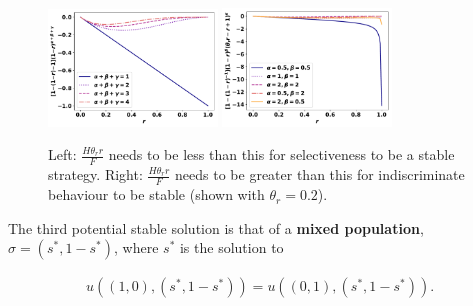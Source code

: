 \documentclass[10pt]{article}
\begin{document}
\begin{figure}[h]
\centering
\includegraphics[width = 0.4\textwidth]{images/SelectiveInequality}
\includegraphics[width = 0.4\textwidth, height=.275\textwidth]{images/IndiscriminateInequality}
\caption{\label{fig:Inequality} Left: \(\frac{H \theta_r r}{F}\) needs to be less 
than this for selectiveness to be a stable strategy. Right:  \(\frac{H \theta_r r}{F}\)
needs to be greater than this for indiscriminate behaviour to be stable 
(shown with \(\theta_r=0.2\)).}
\end{figure}


The third potential stable solution is that of a \textbf{mixed population}, 
\(\sigma = (s^*, 1 - s^*)\), where \(s^*\) is the solution to

\begin{eqnarray}
\label{eqn:s1xs_s0xs}
u((1, 0),(s^*, 1 - s^*)) = u((0, 1),(s^*, 1 - s^*)).
\end{eqnarray}
\end{document}
